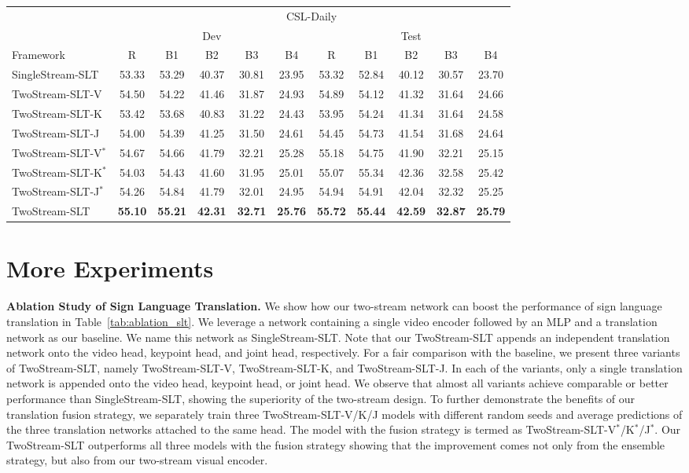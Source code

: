 \documentclass{article}
\begin{document}
\begin{table}[t]
{\begin{tabular}{l|c c c c c|c c c c c}
    \bottomrule
    \toprule
& \multicolumn{10}{c}{CSL-Daily}  \\
    &\multicolumn{5}{c|}{Dev}& \multicolumn{5}{c}{Test}\\
    Framework&R&B1&B2&B3&B4&R&B1&B2&B3&B4 \\
    \midrule
    SingleStream-SLT &53.33&53.29&40.37&30.81&23.95&53.32&52.84&40.12&30.57&23.70 \\
    \midrule
    TwoStream-SLT-V &54.50&54.22&41.46&31.87&24.93&54.89&54.12&41.32&31.64&24.66 \\
    TwoStream-SLT-K &53.42&53.68&40.83&31.22&24.43&53.95&54.24&41.34&31.64&24.58 \\
    TwoStream-SLT-J &54.00&54.39&41.25&31.50&24.61&54.45&54.73&41.54&31.68&24.64 \\
    \midrule
    TwoStream-SLT-V$^*$ &54.67&54.66&41.79&32.21&25.28&55.18&54.75&41.90&32.21&25.15 \\
    TwoStream-SLT-K$^*$ &54.03&54.43&41.60&31.95&25.01&55.07&55.34&42.36&32.58&25.42 \\
    TwoStream-SLT-J$^*$ &54.26&54.84&41.79&32.01&24.95&54.94&54.91&42.04&32.32&25.25 \\
    \midrule
    TwoStream-SLT &\textbf{55.10}&\textbf{55.21}&\textbf{42.31}&\textbf{32.71}&\textbf{25.76}&\textbf{55.72}&\textbf{55.44}&\textbf{42.59}&\textbf{32.87}&\textbf{25.79}\\
    \bottomrule
    \end{tabular}}
\end{table}

\section{More Experiments}

\textbf{Ablation Study of Sign Language Translation.}
We show how our two-stream network can boost the performance of sign language translation in Table~\ref{tab:ablation_slt}. 
We leverage a network containing a single video encoder followed by an MLP and a translation network as our baseline.
We name this network as SingleStream-SLT. Note that our TwoStream-SLT appends an independent translation network onto the video head, keypoint head, and joint head, respectively. For a fair comparison with the baseline, we present three variants of TwoStream-SLT, namely TwoStream-SLT-V, TwoStream-SLT-K, and TwoStream-SLT-J. In each of the variants, only a single translation network is appended onto the video head, keypoint head, or joint head. We observe that almost all variants achieve comparable or better performance than SingleStream-SLT, showing the superiority of the two-stream design. To further demonstrate the benefits of our translation fusion strategy, we separately train three TwoStream-SLT-V/K/J models with different random seeds and average predictions of the three translation networks attached to the same head. The model with the fusion strategy is termed as TwoStream-SLT-V$^*$/K$^*$/J$^*$. Our TwoStream-SLT outperforms all three models with the fusion strategy showing that the improvement comes not only from the ensemble strategy, but also from our two-stream visual encoder.
\end{document}
